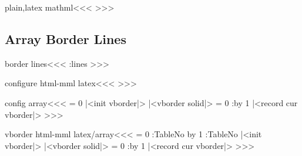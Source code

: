 {{{{{{\<plain,latex mathml\><<<
\Configure{,}
   {{}}
\Configure{:}
   {{}}
\Configure{;}
   {{}}
\Configure{>}
   {{}}
\Configure{!}
   {{}}
>>>


\subsection{Array Border Lines}


\<border lines\><<<
\border:lines
>>>

\<configure html-mml latex\><<<
\def\border:lines{%
  \ifnum \borderlines>0 
     \ifnum \borderlines>1 border-right:solid 1px black;\fi
     \ifodd \borderlines border-left:solid 1px black;\fi
  \fi
}
>>>




\<config array\><<<
   {\HAssign\NewGroup = 0 
    |<init vborder|>}
   {|<vborder solid|>%
    \HAssign\NewGroup = 0}
   {\Advance:\NewGroup by 1 
    |<record cur vborder|>}
   {}
>>>



\<vborder html-mml latex/array\><<<
   {\let\VBorder=\empty \let\AllColMargins=\empty
    \global\let\GROUPS=\empty \HAssign\NewGroup = 0 
    \gHAdvance\Next:TableNo by 1 \global\let\TableNo=\Next:TableNo
    |<init vborder|>%
   }
   {|<vborder solid|>%
    \xdef\VBorder{\VBorder\ifnum \NewGroup> 0 </colgroup>\fi}
    \HAssign\NewGroup = 0  \gdef\GROUPS{rules="groups"}}
   {\Advance:\NewGroup by 1
    |<record cur vborder|>%
    \ifnum {} \xdef\VBorder{\VBorder<colgroup 
        id="TBL-\TableNo-\ar:cnt g">}\fi      
    \xdef\VBorder{\VBorder<col\Hnewline id="TBL-\TableNo
       -\ar:cnt"\xml:empty>}\xdef\AllColMargins{\AllColMargins1}}
   {\xdef\AllColMargins{\AllColMargins 0}}
>>>



}}}}}}

